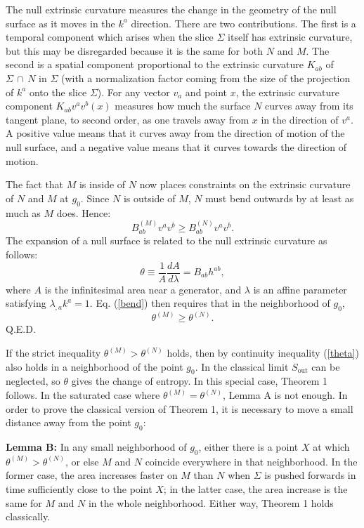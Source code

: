 \documentclass{article}
\begin{document}
The null extrinsic curvature measures the change in the geometry of the null surface as it moves in the $k^a$ direction.  There are two contributions.  The first is a temporal component which arises when the slice $\Sigma$ itself has extrinsic curvature, but this may be disregarded because it is the same for both $N$ and $M$.  The second is a spatial component proportional to the extrinsic curvature $K_{ab}$  of $\Sigma\,\cap\,N$ in $\Sigma$ (with a normalization factor coming from the size of the projection of $k^a$ onto the slice $\Sigma$).  For any vector $v_a$ and point $x$, the extrinsic curvature component $K_{ab} v^a v^b (x)$ measures how much the surface $N$ curves away from its tangent plane, to second order, as one travels away from $x$ in the direction of $v^a$.  A positive value means that it curves away from the direction of motion of the null surface, and a negative value means that it curves towards the direction of motion.  

The fact that $M$ is inside of $N$ now places constraints on the extrinsic curvature of $N$ and $M$ at $g_0$.  Since $N$ is outside of $M$, $N$ must bend outwards by at least as much as $M$ does.  Hence:
\begin{equation}\label{bend}
B_{ab}^{(M)} v^a v^b \ge B_{ab}^{(N)} v^a v^b.
\end{equation}
The expansion of a null surface is related to the null extrinsic curvature as follows:
\begin{equation}\label{exp}
\theta \equiv \frac{1}{A}\frac{dA}{d\lambda} = B_{ab} h^{ab},
\end{equation}
where $A$ is the infinitesimal area near a generator, and $\lambda$ is an affine parameter satisfying $\lambda_{,a} k^a = 1$.  Eq. (\ref{bend}) then requires that in the neighborhood of $g_0$,
\begin{equation}\label{theta}
\theta^{(M)} \ge \theta^{(N)}.
\end{equation}
Q.E.D.

If the strict inequality $\theta^{(M)} > \theta^{(N)}$ holds, then by continuity inequality (\ref{theta}) also holds in a neighborhood of the point $g_0$.  In the classical limit $S_\mathrm{out}$ can be neglected, so $\theta$ gives the change of entropy.  In this special case, Theorem 1 follows.  In the saturated case where $\theta^{(M)} = \theta^{(N)}$, Lemma A is not enough.  In order to prove the classical version of Theorem 1, it is necessary to move a small distance away from the point $g_0$:

\textbf{Lemma B:} In any small neighborhood of $g_0$, either there is a point $X$ at which $\theta^{(M)} > \theta^{(N)}$, or else $M$ and $N$ coincide everywhere in that neighborhood.  In the former case, the area increases faster on $M$ than $N$ when $\Sigma$ is pushed forwards in time sufficiently close to the point $X$; in the latter case, the area increase is the same for $M$ and $N$ in the whole neighborhood.  Either way, Theorem 1 holds classically.
\end{document}
